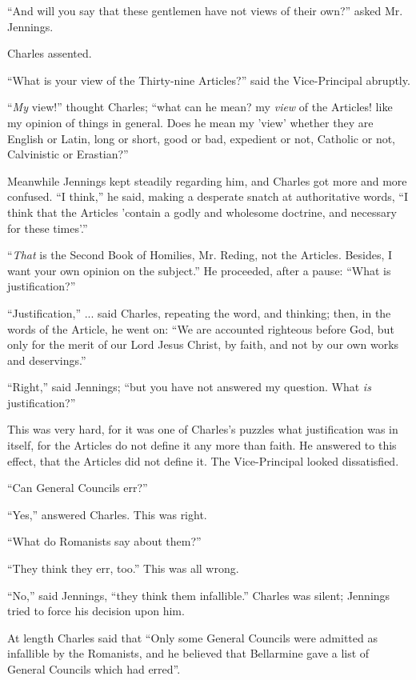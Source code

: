 ``And will you say that these gentlemen have not views of their
own?'' asked Mr. Jennings.

Charles assented.

``What is your view of the Thirty-nine Articles?'' said the
Vice-Principal abruptly.

``\emph{My} view!'' thought Charles; ``what can he
mean? my \emph{view} of the Articles! like my opinion of things in
general. Does he mean my 'view' whether they are English or
Latin, long or short, good or bad, expedient or not, Catholic or not,
Calvinistic or Erastian?''

Meanwhile Jennings kept steadily regarding him, and Charles got
more and more confused. ``I think,'' he said, making a
desperate snatch at authoritative words, ``I think that the
Articles 'contain a godly and wholesome doctrine, and necessary for
these times'.''

``\emph{That} is the Second Book of Homilies, Mr. Reding, not
the Articles. Besides, I want your own opinion on the subject.''
He proceeded, after a pause: ``What is justification?''

``Justification,'' ... said Charles, repeating the word,
and thinking; then, in the words of the Article, he went on: ``We
are accounted righteous before God, but only for the merit of our Lord
Jesus Christ, by faith, and not by our own works and deservings.''

``Right,'' said Jennings; ``but you have not answered
my question. What \emph{is} justification?''

This was very hard, for it was one of Charles's puzzles what
justification was in itself, for the Articles do not define it any
more than faith. He answered to this effect, that the Articles did not
define it. The Vice-Principal looked dissatisfied.

``Can General Councils err?''

``Yes,'' answered Charles. This was right.

``What do Romanists say about them?''

``They think they err, too.'' This was all wrong.

``No,'' said Jennings, ``they think them
infallible.'' Charles was silent; Jennings tried to force his
decision upon him.

At length Charles said that ``Only some General Councils were
admitted as infallible by the Romanists, and he believed that
Bellarmine gave a list of General Councils which had erred''.

